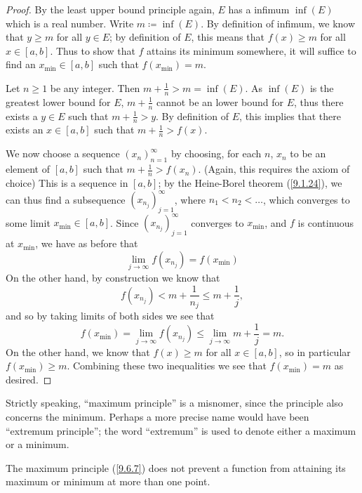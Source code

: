 \begin{proof}
  By the least upper bound principle again, \(E\) has a infimum \(\inf(E)\) which is a real number.
  Write \(m \coloneqq \inf(E)\).
  By definition of infimum, we know that \(y \geq m\) for all \(y \in E\);
  by definition of \(E\), this means that \(f(x) \geq m\) for all \(x \in [a, b]\).
  Thus to show that \(f\) attains its minimum somewhere, it will suffice to find an \(x_{\min} \in [a, b]\) such that \(f(x_{\min}) = m\).

  Let \(n \geq 1\) be any integer.
  Then \(m + \frac{1}{n} > m = \inf(E)\).
  As \(\inf(E)\) is the greatest lower bound for \(E\), \(m + \frac{1}{n}\) cannot be an lower bound for \(E\), thus there exists a \(y \in E\) such that \(m + \frac{1}{n} > y\).
  By definition of \(E\), this implies that there exists an \(x \in [a, b]\) such that \(m + \frac{1}{n} > f(x)\).

  We now choose a sequence \((x_n)_{n = 1}^\infty\) by choosing, for each \(n\), \(x_n\) to be an element of \([a, b]\) such that \(m + \frac{1}{n} > f(x_n)\).
  (Again, this requires the axiom of choice)
  This is a sequence in \([a, b]\);
  by the Heine-Borel theorem (\cref{9.1.24}), we can thus find a subsequence \((x_{n_j})_{j = 1}^\infty\), where \(n_1 < n_2 < \dots\), which converges to some limit \(x_{\min} \in [a, b]\).
  Since \((x_{n_j})_{j = 1}^\infty\) converges to \(x_{\min}\), and \(f\) is continuous at \(x_{\min}\), we have as before that
  \[
    \lim_{j \to \infty} f(x_{n_j}) = f(x_{\min})
  \]
  On the other hand, by construction we know that
  \[
    f(x_{n_j}) < m + \frac{1}{n_j} \leq m + \frac{1}{j},
  \]
  and so by taking limits of both sides we see that
  \[
    f(x_{\min}) = \lim_{j \to \infty} f(x_{n_j}) \leq \lim_{j \to \infty} m + \frac{1}{j} = m.
  \]
  On the other hand, we know that \(f(x) \geq m\) for all \(x \in [a, b]\), so in particular \(f(x_{\min}) \geq m\).
  Combining these two inequalities we see that \(f(x_{\min}) = m\) as desired.
\end{proof}

\begin{remark}\label{9.6.8}
  Strictly speaking, ``maximum principle'' is a misnomer, since the principle also concerns the minimum.
  Perhaps a more precise name would have been ``extremum principle'';
  the word ``extremum'' is used to denote either a maximum or a minimum.
\end{remark}

\begin{note}
  The maximum principle (\cref{9.6.7}) does not prevent a function from attaining its maximum or minimum at more than one point.
\end{note}

